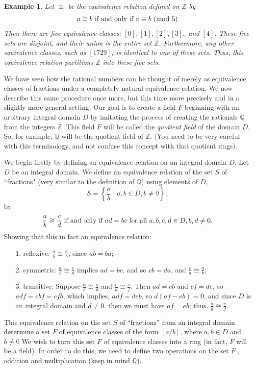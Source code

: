 \documentclass[12pt,reqno]{amsart}
\theoremstyle{plain}
\newtheorem{ex}{Example}
\newcommand{\zz}{\mathbb Z}
\newcommand{\qq}{\mathbb Q}
\newcommand{\Mod}[1]{\ (\mathrm{mod}\ #1)}
\begin{document}
\begin{ex} Let $\cong$ be the equivalence relation defined on $\zz$ by 
\[
\textup{$a \cong b$ if and only if $a \equiv b \Mod{5}$}
\]
Then there are five equivalence classes: $[0], [1], [2], [3],$ and $[4]$. These five sets are disjoint, and their union is the entire set $\zz$. Furthermore, any other equivalence classes, such as $[1729]$, is identical to one of these sets. Thus, this equivalence relation partitions $\zz$ into these five sets. 
\end{ex} 
We have seen how the rational numbers can be thought of merely as equivalence classes of fractions under a completely natural equivalence relation. We now describe this same procedure once more, but this time more precisely and in a slightly more general setting. Our goal is to create a field $F$ beginning with an arbitrary integral domain $D$ by imitating the process of creating the rationals $\qq$ from the integers $\zz$. This field $F$ will be called the \textit{quotient field} of the domain $D$. So, for example, $\qq$ will be the quotient field of $\zz$. (You need to be very careful with this terminology, and not confuse this concept with that quotient rings).

We begin firstly by defining an equivalence relation on an integral domain $D$. Let $D$ be an integral domain. We define an equivalence relation of the set $S$ of ``fractions" (very similar to the definition of $\qq$) using elements of $D$, 
\[
S = \left \{ \frac{a}{b} \mid a, b \in D, b \neq 0 \right \},
\]
by 
\[
\textup{$\frac{a}{b} \cong \frac{c}{d}$ if and only if $ad = bc$ for all $a, b, c,d \in D, b,d \neq 0$.}
\]
Showing that this in fact an equivalence relation:
\begin{itemize}
\item[$1.$] reflexive: $\frac{a}{b} \cong \frac{a}{b}$, since $ab = ba$;
\item[$2.$] symmetric: $\frac{a}{b} \cong \frac{c}{d}$ implies $ad = bc$, and so $cb = da$, and $\frac{c}{d} \cong \frac{a}{b}$;
\item[$3.$] transitive: Suppose $\frac{a}{b} \cong \frac{c}{d}$ and $\frac{c}{d} \cong \frac{e}{f}$. Then $ad = cb$ and $cf = de$, so $adf = cbf = cfb$, which implies, $adf = deb$, so $d(af - eb)=0$, and since $D$ is an integral domain and $d \neq 0$, then we must have $af =eb$; thus, $\frac{a}{b} \cong \frac{e}{f}$.
\end{itemize}

This equivalence relation on the set $S$ of ``fractions” from an integral domain determine a set $F$ of equivalence classes of the form $[a/b]$, where $a, b \in D$ and $b \neq 0$ We wish to turn this set $F$ of equivalence classes into a ring (in fact, $F$ will be a field). In order to do this, we need to define two operations on the set $F$ , addition and multiplication (keep in mind $\qq$).
\end{document}
